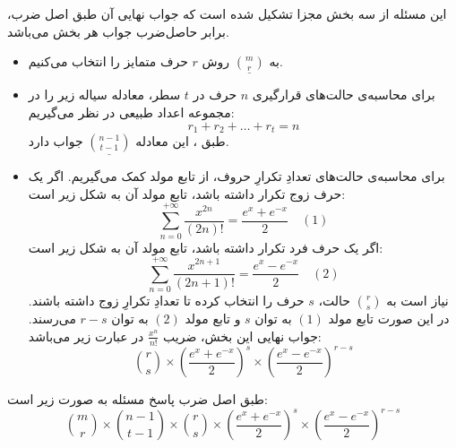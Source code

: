\p
این مسئله از سه بخش مجزا تشکیل شده است که جواب نهایی آن طبق اصل ضرب، برابر حاصل‌ضرب جواب هر بخش می‌باشد.
\begin{itemize}
\item 
به
$\underline{\binom{m}{r}}$
روش $r$ حرف متمایز را انتخاب می‌کنیم.

\item 
برای محاسبه‌ی حالت‌های قرارگیری 
$n$
حرف در
$t$
سطر، معادله سیاله زیر را در مجموعه اعداد طبیعی در نظر می‌گیریم: 
$$r_1 + r_2 + \ldots + r_t = n$$
طبق 
،
این معادله
$\underline{\binom{n - 1}{t - 1}}$
جواب دارد.

\item
برای محاسبه‌ی حالت‌های تعدادِ تکرارِ حروف، از تابع مولد کمک می‌گیریم.
اگر یک حرف زوج تکرار داشته باشد، تابع مولد آن به شکل زیر است:
\[ \sum_{n=0}^{+\infty} \frac{x^{2n}}{(2n)!} = \frac{e^x + e^{-x}}{2} \quad (1) \]
اگر یک حرف فرد تکرار داشته باشد، تابع مولد آن به شکل زیر است:
\[ \sum_{n=0}^{+\infty} \frac{x^{2n + 1}}{(2n + 1)!} = \frac{e^x - e^{-x}}{2} \quad (2) \]
نیاز است به 
$\binom{r}{s}$
حالت، 
$s$
حرف را انتخاب کرده تا تعدادِ تکرارِ زوج داشته باشند.
در این صورت تابع مولد
$(1)$
به توان 
$s$
و تابع مولد
$(2)$
به توان 
$r-s$
می‌رسند.
 جواب نهایی این بخش، ضریب
$\frac{x^n}{n!}$
در عبارت زیر می‌باشد:
\[ \binom{r}{s}\times\left({\frac{e^x + e^{-x}}{2}}\right)^s\times\left({\frac{e^x - e^{-x}}{2}}\right)^{r - s} \]
\end{itemize} 
\p
طبق اصل ضرب پاسخ مسئله به صورت زیر است:
$$\binom{m}{r} \times \binom{n - 1}{t - 1} \times \binom{r}{s}\times\left({\frac{e^x + e^{-x}}{2}}\right)^s\times\left({\frac{e^x - e^{-x}}{2}}\right)^{r - s}  $$
